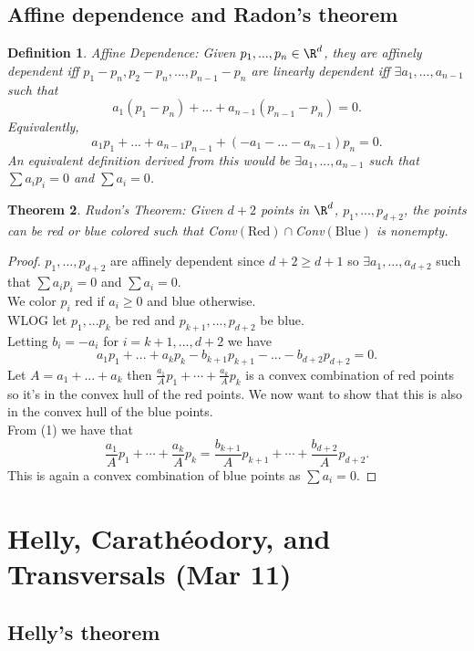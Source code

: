 \documentclass[a4paper]{article}
\newtheorem{thm}{Theorem}[section]
\newtheorem{defn}[thm]{Definition}
\begin{document}
\subsection{Affine dependence and Radon's theorem}

\begin{defn}
    Affine Dependence: Given $p_1,...,p_n\in \R^d$, they are affinely dependent iff $p_1-p_n,p_2-p_n,...,p_{n-1}-p_n$ are linearly dependent iff $\exists a_1,...,a_{n-1}$ such that 
    \[
        a_1(p_1-p_n)+...+a_{n-1}(p_{n-1}-p_n)=0
    .\] 
    Equivalently, \[
    a_1p_1+...+a_{n-1}p_{n-1}+(-a_1-...-a_{n-1})p_n=0
    .\] 
    An equivalent definition derived from this would be $\exists a_1,...,a_{n-1}$ such that $\sum a_ip_i=0$ and $\sum a_i=0$. 
\end{defn}
\begin{thm}
    Rudon's Theorem: Given $d+2$ points in $\R^d$, $p_1,...,p_{d+2}$, the points can be red or blue colored such that Conv$(\text{Red})\cap$Conv$(\text{Blue})$ is nonempty. 
\end{thm}
\begin{proof}
    $p_1,...,p_{d+2}$ are affinely dependent since $d+2\geq d+1$ so $\exists a_1,...,a_{d+2}$ such that $\sum a_ip_i=0$ and $\sum a_i=0$. \\
    We color $p_i$ red if $a_i\geq 0$ and blue otherwise. \\
    WLOG let $p_1,...p_k$ be red and $p_{k+1},...,p_{d+2}$ be blue. \\
    Letting $b_i=-a_i$ for $i=k+1,...,d+2$ we have 
    \[
    a_1p_1+...+a_kp_k-b_{k+1}p_{k+1}-...-b_{d+2}p_{d+2}=0 \tag{1}
    .\] 
    Let $A=a_1+...+a_k$ then $\frac{a_1}{A}p_1+\cdots+\frac{a_k}{A}p_k$ is a convex combination of red points so it's in the convex hull of the red points. We now want to show that this is also in the convex hull of the blue points. \\
    From (1)  we have that 
    \[
        \frac{a_1}{A}p_1+\cdots+\frac{a_k}{A}p_k=\frac{b_{k+1}}{A}p_{k+1}+\cdots+\frac{b_{d+2}}{A}p_{d+2}
    .\] 
    This is again a convex combination of blue points as $\sum a_i=0$. 
\end{proof}
\newpage
\section{Helly, Carath\'eodory, and Transversals (Mar 11)}

\subsection{Helly's theorem}
\end{document}
